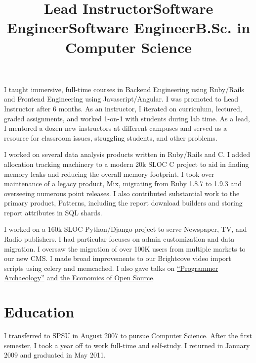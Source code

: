 \documentclass[margintitle,line]{res}
\begin{document}
\begin{resume}
\title{Lead Instructor}
\begin{position}
  I taught immersive, full-time courses in Backend Engineering using Ruby/Rails and Frontend Engineering using Javascript/Angular.
  I was promoted to Lead Instructor after 6 months. As an instructor, I iterated
  on curriculum, lectured, graded assignments, and worked 1-on-1 with students
  during lab time. As a lead, I mentored a dozen new instructors at different
  campuses and served as a resource for classroom issues, struggling students,
  and other problems.
\end{position}

\title{Software Engineer}
\begin{position}
  I worked on several data analysis products written in Ruby/Rails and C.
  I added allocation tracking machinery to a modern 20k SLOC C project to aid
  in finding memory leaks and reducing the overall memory footprint. I took
  over maintenance of a legacy product, Mix, migrating from Ruby 1.8.7 to 1.9.3
  and overseeing numerous point releases. I also contributed substantial work
  to the primary product, Patterns, including the report download builders and
  storing report attributes in SQL shards.
\end{position}

\title{Software Engineer}
\begin{position}
  I worked on a 160k SLOC Python/Django project to serve Newspaper,
  TV, and Radio publishers. I had particular focuses on admin
  customization and data migration. I oversaw the migration of over
  100K users from multiple markets to our new CMS.
  I made broad improvements to our Brightcove video import
  scripts using celery and memcached. I also gave talks on
  \href{http://redlinernotes.com/docs/talks/opa.html}{``Programmer
    Archaeology''} and
  \href{http://redlinernotes.com/docs/talks/wosw.html}{the Economics
    of Open Source}.
\end{position}


\section{Education}

\title{B.Sc. in Computer Science}
\begin{position}
  I transferred to SPSU in August 2007 to pursue Computer Science.
  After the first semester, I took a year off to work full-time and self-study.
  I returned in January 2009 and graduated in May 2011.
\end{position}


\end{resume}
\end{document}
